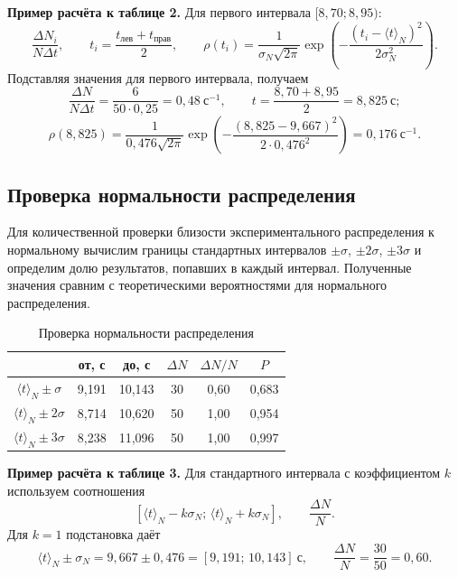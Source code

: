 \documentclass[a4paper,14pt]{extarticle}
\begin{document}
	\noindent\textbf{Пример расчёта к таблице 2.} Для первого интервала $[8{,}70; 8{,}95)$:
	\[
	\frac{\Delta N_i}{N\Delta t}, \qquad
	t_i=\frac{t_{\text{лев}}+t_{\text{прав}}}{2}, \qquad
	\rho(t_i)=\frac{1}{\sigma_N\sqrt{2\pi}}
	\exp\left(-\frac{(t_i-\langle t \rangle_N)^2}{2\sigma_N^2}\right).
	\]
	Подставляя значения для первого интервала, получаем
	\[
	\frac{\Delta N}{N\Delta t} = \frac{6}{50\cdot0{,}25} = 0{,}48\ \text{с}^{-1},
	\qquad
	t = \frac{8{,}70+8{,}95}{2} = 8{,}825\ \text{с};
	\]
	\[
	\rho(8{,}825) = \frac{1}{0{,}476\sqrt{2\pi}}
	\exp\left(-\frac{(8{,}825-9{,}667)^2}{2\cdot0{,}476^2}\right)
	= 0{,}176\ \text{с}^{-1}.
	\]

	\clearpage
	\subsection{Проверка нормальности распределения}
	
	Для количественной проверки близости экспериментального распределения к нормальному вычислим границы стандартных интервалов \(\pm \sigma\), \(\pm 2\sigma\), \(\pm 3\sigma\) и определим долю результатов, попавших в каждый интервал. Полученные значения сравним с теоретическими вероятностями для нормального распределения.
	
	\begingroup
	\renewcommand{\arraystretch}{1.6}
	\begin{table}[h!]
		\centering
		\caption{Проверка нормальности распределения}
		\label{tab:norm}
		\begin{tabular}{|c|c|c|c|c|c|}
			\hline
			 & от, с & до, с & \(\Delta N\) & \(\Delta N / N\) & \(P\) \\ \hline
			\(\langle t \rangle_N \pm \sigma\) & 9,191 & 10,143 & 30 & 0,60 & 0,683 \\ \hline
			\(\langle t \rangle_N \pm 2\sigma\) & 8,714 & 10,620 & 50 & 1,00 & 0,954 \\ \hline
			\(\langle t \rangle_N \pm 3\sigma\) & 8,238 & 11,096 & 50 & 1,00 & 0,997 \\ \hline
		\end{tabular}
	\end{table}
	\endgroup

	\noindent\textbf{Пример расчёта к таблице 3.}
	Для стандартного интервала с коэффициентом $k$ используем соотношения
	\[
	\left[\langle t \rangle_N-k\sigma_N;\,\langle t \rangle_N+k\sigma_N\right],
	\qquad
	\frac{\Delta N}{N}.
	\]
	Для $k=1$ подстановка даёт
	\[
	\langle t \rangle_N \pm \sigma_N = 9{,}667 \pm 0{,}476 = [9{,}191;\,10{,}143]\ \text{с},
	\qquad
	\frac{\Delta N}{N} = \frac{30}{50} = 0{,}60.
	\]
\end{document}
